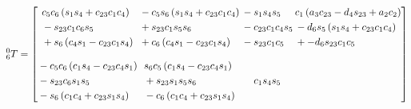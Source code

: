 \begin{equation} \label{eq:T60}
    \setlength{\arraycolsep}{1pt}
    {_6^{0}}T=\begin{bmatrix}
        \begin{aligned}
             & c_5c_6\left(s_1s_4 + c_{23}c_1c_4\right)\\
             & -s_{23}c_1c_6s_5 \\
             & +s_6\left(c_4s_1 - c_{23}c_1s_4\right)
        \end{aligned}   &
        \begin{aligned}
             & -c_5s_6\left(s_1s_4 + c_{23}c_1c_4\right) \\
             &+ s_{23}c_1s_5s_6 \\
             & +c_6\left(c_4s_1 - c_{23}c_1s_4\right)
        \end{aligned} &
        \begin{aligned}
             & -s_1s_4s_5 \\
             &- c_{23}c_1c_4s_5 \\
             & -s_{23}c_1c_5
        \end{aligned}                              &
        \begin{aligned}
             & c_1\left(a_3c_{23} - d_4s_{23} + a_2c_2\right)                        \\
             & -d_6s_5\left(s_1s_4 + c_{23}c_1c_4\right) \\
             &+ -d_6s_{23}c_1c_5
        \end{aligned}              \\\\
        \begin{aligned}
             & -c_5c_6\left(c_1s_4 - c_{23}c_4s_1\right) \\
             &- s_{23}c_6s_1s_5 \\
             & -s_6\left(c_1c_4 + c_{23}s_1s_4\right)
        \end{aligned} &
        \begin{aligned}
             & s_6c_5\left(c_1s_4 - c_{23}c_4s_1\right) \\
             &+ s_{23}s_1s_5s_6 \\
             & -c_6\left(c_1c_4 + c_{23}s_1s_4\right)
        \end{aligned}  &
        \begin{aligned}
             & c_1s_4s_5 \\

\end{aligned}
\end{bmatrix}
\end{equation}
